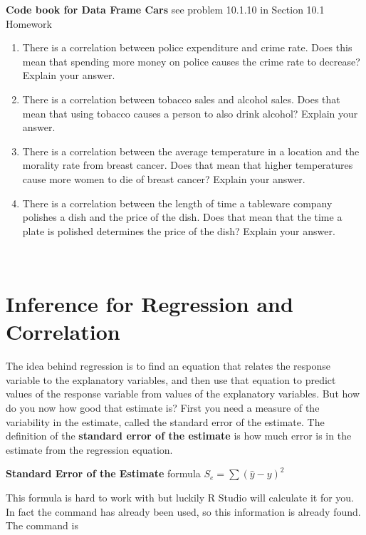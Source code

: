 \documentclass[
]{book}
\begin{document}
\textbf{Code book for Data Frame Cars} see problem 10.1.10 in Section 10.1 Homework

\begin{enumerate}
\def\labelenumi{\arabic{enumi}.}
\setcounter{enumi}{10}
\item
  There is a correlation between police expenditure and crime rate. Does this mean that spending more money on police causes the crime rate to decrease? Explain your answer.
\item
  There is a correlation between tobacco sales and alcohol sales. Does that mean that using tobacco causes a person to also drink alcohol? Explain your answer.
\item
  There is a correlation between the average temperature in a location and the morality rate from breast cancer. Does that mean that higher temperatures cause more women to die of breast cancer? Explain your answer.
\item
  There is a correlation between the length of time a tableware company polishes a dish and the price of the dish. Does that mean that the time a plate is polished determines the price of the dish? Explain your answer.
\end{enumerate}

\textbf{\\
}

\hypertarget{inference-for-regression-and-correlation}{%
\section{Inference for Regression and Correlation}\label{inference-for-regression-and-correlation}}

The idea behind regression is to find an equation that relates the response variable to the explanatory variables, and then use that equation to predict values of the response variable from values of the explanatory variables. But how do you now how good that estimate is? First you need a measure of the variability in the estimate, called the standard error of the estimate. The definition of the \textbf{standard error of the estimate} is how much error is in the estimate from the regression equation.

\textbf{Standard Error of the Estimate} formula \(S_e=\sum{(\hat{y}-y)^2}\)

This formula is hard to work with but luckily R Studio will calculate it for you. In fact the command has already been used, so this information is already found. The command is
\end{document}
